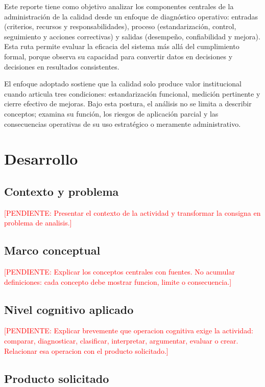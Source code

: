 \documentclass[
	spanish,
	letterpaper, oneside
]{article}
\newcommand{\pendiente}[1]{\textcolor{red}{[PENDIENTE: #1]}}
\begin{document}
Este reporte tiene como objetivo analizar los componentes centrales de la administración de la calidad desde un enfoque de diagnóstico operativo: entradas (criterios, recursos y responsabilidades), proceso (estandarización, control, seguimiento y acciones correctivas) y salidas (desempeño, confiabilidad y mejora). Esta ruta permite evaluar la eficacia del sistema más allá del cumplimiento formal, porque observa su capacidad para convertir datos en decisiones y decisiones en resultados consistentes.

El enfoque adoptado sostiene que la calidad solo produce valor institucional cuando articula tres condiciones: estandarización funcional, medición pertinente y cierre efectivo de mejoras. Bajo esta postura, el análisis no se limita a describir conceptos; examina su función, los riesgos de aplicación parcial y las consecuencias operativas de su uso estratégico o meramente administrativo.

\section{Desarrollo}

\subsection{Contexto y problema}

\pendiente{Presentar el contexto de la actividad y transformar la consigna en problema de analisis.}

\subsection{Marco conceptual}

\pendiente{Explicar los conceptos centrales con fuentes. No acumular definiciones: cada concepto debe mostrar funcion, limite o consecuencia.}

\subsection{Nivel cognitivo aplicado}

\pendiente{Explicar brevemente que operacion cognitiva exige la actividad: comparar, diagnosticar, clasificar, interpretar, argumentar, evaluar o crear. Relacionar esa operacion con el producto solicitado.}

\subsection{Producto solicitado}
\end{document}
